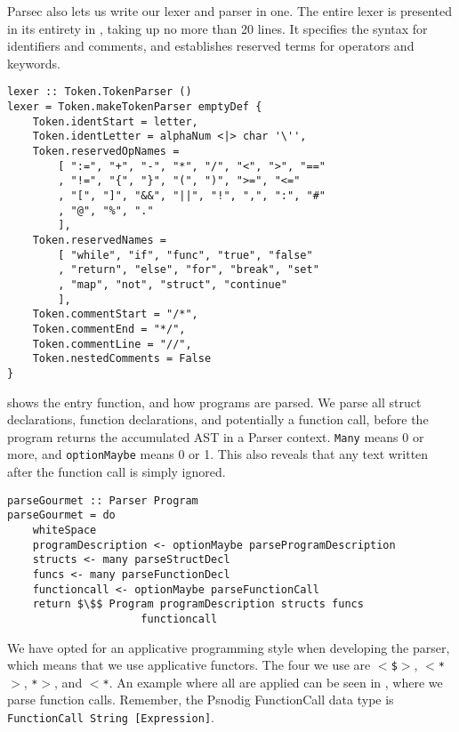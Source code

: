 Parsec also lets us write our lexer and parser in one. The entire lexer is presented in its entirety in , taking up no more than 20 lines. It specifies the syntax for identifiers and comments, and establishes reserved terms for operators and keywords. \\

\begin{lstlisting}[caption={The Gourmet lexer.}, captionpos=b, label={The Gourmet lexer.}]
lexer :: Token.TokenParser ()
lexer = Token.makeTokenParser emptyDef {
    Token.identStart = letter,
    Token.identLetter = alphaNum <|> char '\'',
    Token.reservedOpNames =
        [ ":=", "+", "-", "*", "/", "<", ">", "=="
        , "!=", "{", "}", "(", ")", ">=", "<="
        , "[", "]", "&&", "||", "!", ",", ":", "#"
        , "@", "%", "."
        ],
    Token.reservedNames =
        [ "while", "if", "func", "true", "false"
        , "return", "else", "for", "break", "set"
        , "map", "not", "struct", "continue"
        ],
    Token.commentStart = "/*",
    Token.commentEnd = "*/",
    Token.commentLine = "//",
    Token.nestedComments = False
}
\end{lstlisting}

 shows the entry function, and how programs are parsed. We parse all struct declarations, function declarations, and potentially a function call, before the program returns the accumulated AST in a Parser context. \texttt{Many} means 0 or more, and \texttt{optionMaybe} means 0 or 1. This also reveals that any text written after the function call is simply ignored. \\

\begin{lstlisting}[caption={Parsing Gourmet programs.}, captionpos=b, label={parsingGourmet}]
parseGourmet :: Parser Program
parseGourmet = do
    whiteSpace
    programDescription <- optionMaybe parseProgramDescription
    structs <- many parseStructDecl
    funcs <- many parseFunctionDecl
    functioncall <- optionMaybe parseFunctionCall
    return $\$$ Program programDescription structs funcs
                     functioncall
\end{lstlisting}

We have opted for an applicative programming style when developing the parser, which means that we use applicative functors. The four we use are \texttt{$<$\$$>$}, \texttt{$<$*$>$}, \texttt{*$>$}, and \texttt{$<$*}. An example where all are applied can be seen in , where we parse function calls. Remember, the Psnodig FunctionCall data type is \texttt{FunctionCall String [Expression]}. \\

